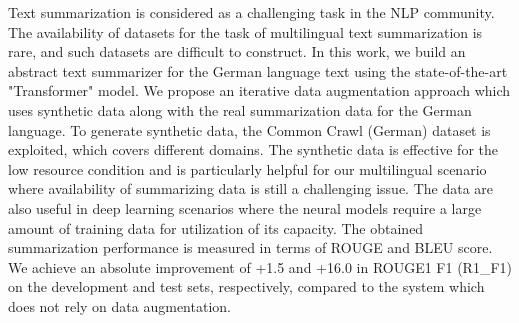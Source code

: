 Text summarization is considered as a challenging task in the NLP community. The availability of datasets for the task of multilingual text summarization is rare, and such datasets are difficult to construct. In this work, we build an abstract text summarizer for the German language text using the state-of-the-art "Transformer" model. We propose an iterative data augmentation approach which uses synthetic data along with the real summarization data for the German language. To generate synthetic data, the Common Crawl (German) dataset is exploited, which covers different domains. The synthetic data is effective for the low resource condition and is particularly helpful for our multilingual scenario where availability of summarizing data is still a challenging issue. The data are also useful in deep learning scenarios where the neural models require a large amount of training data for utilization of its capacity. The obtained summarization performance is measured in terms of ROUGE and BLEU score. We achieve an absolute improvement of +1.5 and +16.0  in ROUGE1 F1 (R1\_F1) on the development and test sets, respectively, compared to the system which does not rely on data augmentation.